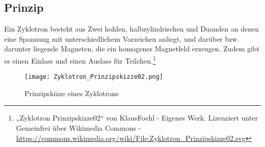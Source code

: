 




%
%	





\subsection{Prinzip}

Ein Zyklotron besteht aus Zwei hohlen, halbzylindrischen und Duanden an denen eine Spannung mit unterschiedlichem Vorzeichen anliegt, und darüber bzw. darunter liegende Magneten, die ein homogenes Magnetfeld erzeugen. Zudem gibt es einen Einlass und einen Auslass für Teilchen.\footnote{„Zyklotron Prinzipskizze02“ von KlausFoehl - Eigenes Werk. Lizenziert unter Gemeinfrei über Wikimedia Commons - \url{https://commons.wikimedia.org/wiki/File:Zyklotron_Prinzipskizze02.svg}}


\begin{wrapfigure}{o}{0.4\textwidth} \label{Zyklo}

	\vspace{-10pt}
	\texttt{[image: Zyklotron\_Prinzipskizze02.png]}
	\vspace{-13pt}
	\caption{Prinzipskizze eines Zyklotrons}
	\vspace{-5pt}	
	
\end{wrapfigure}

